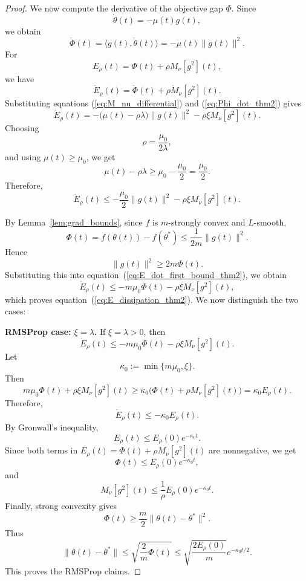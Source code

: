 \documentclass[10pt,a4paper]{amsart}
\begin{document}
\begin{proof}
We now compute the derivative of the objective gap $\Phi$. Since
\[
\dot\theta(t)
=
-
\mu(t)g(t),
\]
we obtain
\begin{equation}
\label{eq:Phi_dot_thm2}
\dot\Phi(t)
=
\langle g(t),\dot\theta(t)\rangle
=
-\mu(t)\|g(t)\|^2.
\end{equation}
For
\[
E_\rho(t)
=
\Phi(t)+\rho M_\nu[g^2](t),
\]
we have
\[
\dot E_\rho(t)
=
\dot\Phi(t)+\rho \dot M_\nu[g^2](t).
\]
Substituting equations (\ref{eq:M_nu_differential}) and (\ref{eq:Phi_dot_thm2}) gives
\begin{equation}
\label{eq:E_dot_raw_thm2}
\dot E_\rho(t)
=
-
\bigl(\mu(t)-\rho\lambda\bigr)\|g(t)\|^2
-
\rho\xi M_\nu[g^2](t).
\end{equation}
Choosing
\[
\rho
=
\frac{\mu_0}{2\lambda},
\]
and using \(\mu(t)\ge \mu_0\), we get
\[
\mu(t)-\rho\lambda
\ge
\mu_0-\frac{\mu_0}{2}
=
\frac{\mu_0}{2}.
\]
Therefore,
\begin{equation}
\label{eq:E_dot_first_bound_thm2}
\dot E_\rho(t)
\le
-
\frac{\mu_0}{2}\|g(t)\|^2
-
\rho\xi M_\nu[g^2](t).
\end{equation}

By Lemma~\ref{lem:grad_bounds}, since \(f\) is \(m\)-strongly convex and \(L\)-smooth,
\[
\Phi(t)
=
f(\theta(t))-f(\theta^*)
\le
\frac{1}{2m}\|g(t)\|^2.
\]
Hence
\[
\|g(t)\|^2
\ge
2m\Phi(t).
\]
Substituting this into equation~(\ref{eq:E_dot_first_bound_thm2}), we obtain
\[
\dot E_\rho(t)
\le
-
m\mu_0\Phi(t)
-
\rho\xi M_\nu[g^2](t),
\]
which proves equation~(\ref{eq:E_dissipation_thm2}). We now distinguish the two cases:

\medskip

\noindent\textbf{RMSProp case: \(\xi=\lambda\).}
If \(\xi=\lambda>0\), then
\[
\dot E_\rho(t)
\le
-
m\mu_0\Phi(t)
-
\rho\xi M_\nu[g^2](t).
\]
Let
\[
\kappa_0
:=
\min\{m\mu_0,\xi\}.
\]
Then
\[
m\mu_0\Phi(t)
+
\rho\xi M_\nu[g^2](t)
\ge
\kappa_0
\bigl(
\Phi(t)+\rho M_\nu[g^2](t)
\bigr)
=
\kappa_0 E_\rho(t).
\]
Therefore,
\[
\dot E_\rho(t)
\le
-\kappa_0 E_\rho(t).
\]
By Gronwall's inequality,
\[
E_\rho(t)
\le
E_\rho(0)e^{-\kappa_0 t}.
\]
Since both terms in \(E_\rho(t)=\Phi(t)+\rho M_\nu[g^2](t)\) are nonnegative, we get
\[
\Phi(t)
\le
E_\rho(0)e^{-\kappa_0 t},
\]
and
\[
M_\nu[g^2](t)
\le
\frac{1}{\rho}E_\rho(0)e^{-\kappa_0 t}.
\]
Finally, strong convexity gives
\[
\Phi(t)
\ge
\frac m2\|\theta(t)-\theta^*\|^2.
\]
Thus
\[
\|\theta(t)-\theta^*\|
\le
\sqrt{\frac{2}{m}\Phi(t)}
\le
\sqrt{\frac{2E_\rho(0)}{m}}e^{-\kappa_0 t/2}.
\]
This proves the RMSProp claims.

\medskip


\end{proof}
\end{document}
